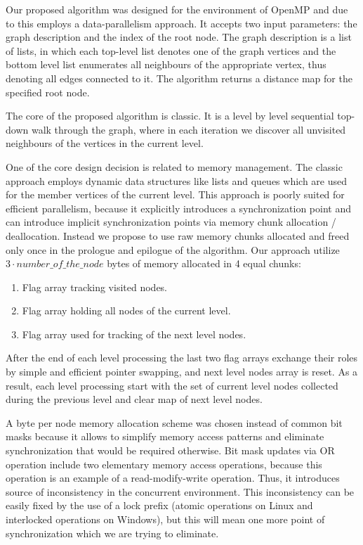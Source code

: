 \documentclass[letterpaper]{article}
\begin{document}
			Our proposed algorithm was designed for the environment of OpenMP and due to this employs a data-parallelism approach. 
			It accepts two input parameters: the graph description and the index of the root node.
			The graph description is a list of lists, in which each top-level list denotes one of the graph vertices and the bottom level list enumerates all neighbours of the appropriate vertex, thus denoting all edges connected to it.
			The algorithm returns a distance map for the specified root node.
			
			The core of the proposed algorithm is classic.
			It is a level by level sequential top-down walk through the graph, where in each iteration we discover all unvisited neighbours of the vertices in the current level.
			
			One of the core design decision is related to memory management.
			The classic approach employs dynamic data structures like lists and queues which are used for the member vertices of the current level.
			This approach is poorly suited for efficient parallelism, because it explicitly introduces a synchronization point and can introduce implicit synchronization points via memory chunk allocation / deallocation. 
			Instead we propose to use raw memory chunks allocated and freed only once in the prologue and epilogue of the algorithm.
			Our approach utilize $3 \cdot number\_of\_the\_node$ bytes of memory allocated in 4 equal chunks:
			\begin{enumerate}
				\item Flag array tracking visited nodes.
				\item Flag array holding all nodes of the current level.
				\item Flag array used for tracking of the next level nodes.
			\end{enumerate}
			
			After the end of each level processing the last two flag arrays exchange their roles by simple and efficient pointer swapping, and next level nodes array is reset.
			As a result, each level processing start with the set of current level nodes collected during the previous level and clear map of next level nodes. 

			A byte per node memory allocation scheme was chosen instead of common bit masks because it allows to simplify memory access patterns and eliminate synchronization that would be required otherwise.
			Bit mask updates via OR operation include two elementary memory access operations, because this operation is an example of a read-modify-write operation.
			Thus, it introduces source of inconsistency in the concurrent environment.
			This inconsistency can be easily fixed by the use of a lock prefix (atomic operations on Linux and interlocked operations on Windows), but this will mean one more point of synchronization which we are trying to eliminate.
			
\end{document}
